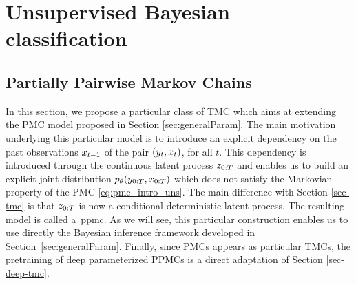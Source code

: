 \chapter{Unsupervised Bayesian classification}
\label{chap:appendix4}


\tocless\section{Partially Pairwise Markov Chains}
\label{sec-rnn}
In this section, we propose a particular class of TMC which aims at extending the PMC model 
proposed in Section 
\ref{sec:generalParam}. The main motivation
underlying this particular model is
to introduce an explicit
dependency on 
the past observations $x_{t-1}$ of the 
pair $(y_t,x_t)$, for all $t$. This
dependency is introduced through
the continuous latent process $z_{0:T}$
and enables us to build an 
explicit joint 
distribution $p_{\theta}(y_{0:T},x_{0:T})$
which does 
not satisfy the Markovian property of
the PMC \eqref{eq:pmc_intro_uns}. The main difference
with Section \ref{sec-tmc} is that 
$z_{0:T}$ is now a conditional deterministic 
latent process.
The resulting model is called a~\gls*{ppmc}.
As we will see, this particular
construction enables us to use directly the Bayesian inference framework developed in Section~\ref{sec:generalParam}.
Finally, since PMCs appears
as particular TMCs, the pretraining of
deep parameterized PPMCs is a direct adaptation of 
Section \ref{sec-deep-tmc}.


